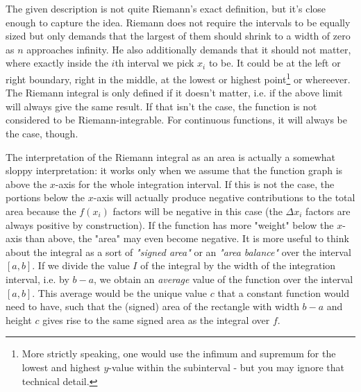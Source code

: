 \medskip
The given description is not quite Riemann's exact definition, but it's close enough to capture the idea. Riemann does not require the intervals to be equally sized but only demands that the largest of them should shrink to a width of zero as $n$ approaches infinity. He also additionally demands that it should not matter, where exactly inside the $i$th interval we pick $x_i$ to be. It could be at the left or right boundary, right in the middle, at the lowest or highest point\footnote{More strictly speaking, one would use the infimum and supremum for the lowest and highest $y$-value within the subinterval - but you may ignore that technical detail.} or whereever. The Riemann integral is only defined if it doesn't matter, i.e. if the above limit will always give the same result. If that isn't the case, the function is not considered to be Riemann-integrable. For continuous functions, it will always be the case, though.


\medskip
The interpretation of the Riemann integral as an area is actually a somewhat sloppy interpretation: it works only when we assume that the function graph is above the $x$-axis for the whole integration interval. If this is not the case, the portions below the $x$-axis will actually produce negative contributions to the total area because the $f(x_i)$ factors will be negative in this case (the $\Delta x_i$ factors are always positive by construction). If the function has more "weight" below the $x$-axis than above, the "area" may even become negative. It is more useful to think about the integral as a sort of \emph{"signed area"} or an \emph{"area balance"} over the interval $[a,b]$. If we divide the value $I$ of the integral by the width of the integration interval, i.e. by $b-a$, we obtain an \emph{average} value of the function over the interval $[a,b]$. This average would be the unique value $c$ that a constant function would need to have, such that the (signed) area of the rectangle with width $b-a$ and height $c$ gives rise to the same signed area as the integral over $f$.


